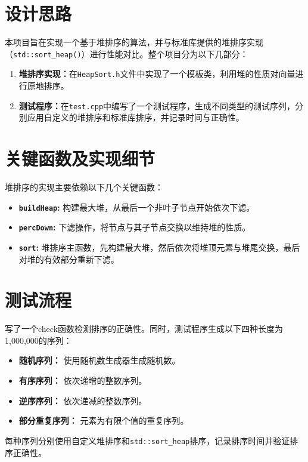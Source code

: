 \documentclass[UTF8]{ctexart}
\begin{document}
\pagestyle{fancy}
\fancyhead{}

\section{设计思路}
本项目旨在实现一个基于堆排序的算法，并与标准库提供的堆排序实现（\texttt{std::sort\_heap()}）进行性能对比。整个项目分为以下几部分：
\begin{enumerate}
    \item \textbf{堆排序实现：}在\texttt{HeapSort.h}文件中实现了一个模板类，利用堆的性质对向量进行原地排序。
    \item \textbf{测试程序：}在\texttt{test.cpp}中编写了一个测试程序，生成不同类型的测试序列，分别应用自定义的堆排序和标准库排序，并记录时间与正确性。
\end{enumerate}

\section{关键函数及实现细节}
堆排序的实现主要依赖以下几个关键函数：
\begin{itemize}
    \item \textbf{\texttt{buildHeap}:} 构建最大堆，从最后一个非叶子节点开始依次下滤。
    \item \textbf{\texttt{percDown}:} 下滤操作，将节点与其子节点交换以维持堆的性质。
    \item \textbf{\texttt{sort}:} 堆排序主函数，先构建最大堆，然后依次将堆顶元素与堆尾交换，最后对堆的有效部分重新下滤。
\end{itemize}



\section{测试流程}
写了一个check函数检测排序的正确性。同时，测试程序生成以下四种长度为1,000,000的序列：
\begin{itemize}
    \item \textbf{随机序列：} 使用随机数生成器生成随机数。
    \item \textbf{有序序列：} 依次递增的整数序列。
    \item \textbf{逆序序列：} 依次递减的整数序列。
    \item \textbf{部分重复序列：} 元素为有限个值的重复序列。
\end{itemize}

每种序列分别使用自定义堆排序和\texttt{std::sort\_heap}排序，记录排序时间并验证排序正确性。
\end{document}

